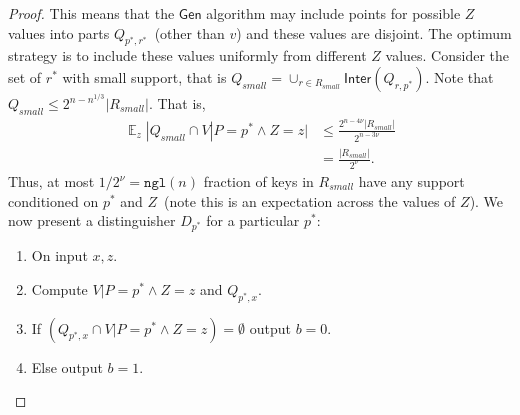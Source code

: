 \documentclass[11pt]{article}
\DeclareMathOperator*{\expe}{\mathbb{E}}
\newcommand{\class}[1]{{\ensuremath{\mathsf{#1}}}}
\newcommand{\gen}{\ensuremath{\class{Gen}}\xspace}
\newcommand{\inter}{\ensuremath{\class{Inter}}\xspace}
\newcommand{\ngl}{\ensuremath{\mathtt{ngl}}\xspace}
\begin{document}
\begin{proof}
This means that the $\gen$ algorithm may include points for possible $Z$ values into parts $Q_{p^*, r^*}$~(other than $v$) and these values are disjoint.  The optimum strategy is to include these values uniformly from different $Z$ values.  Consider the set of $r^*$ with small support, that is $Q_{small} = \cup_{r\in R_{small}} \inter(Q_{r, p^*})$.  Note that $Q_{small} \le 2^{n-n^{1/3}}|R_{small}|$.
That is, 
\begin{align*}
\expe_z |Q_{small} \cap V | P=p^* \wedge Z=z | &\le \frac{2^{n-4\nu}|R_{small}|}{2^{n - 3\nu}}\\
&=\frac{|R_{small}|}{2^{\nu}}.
\end{align*}
Thus, at most $1/2^{\nu} = \ngl(n)$ fraction of keys in $R_{small}$ have any support  conditioned on $p^*$ and $Z$~(note this is an expectation across the values of $Z$).  We now present a distinguisher $D_{p^*}$ for a particular $p^*$:
\begin{enumerate}
\item On input $x, z$.
\item Compute $V|P=p^* \wedge Z=z$ and $Q_{p^*, x}$. 
\item If $(Q_{p^*, x} \cap V|P=p^* \wedge Z=z) =\emptyset$ output $b=0$.
\item Else output $b=1$.
\end{enumerate}


\end{proof}
\end{document}
